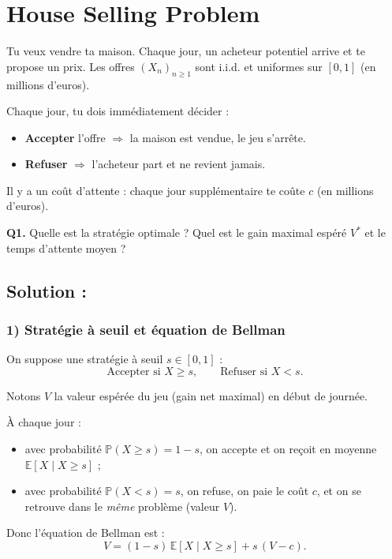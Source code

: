 \section{House Selling Problem}

\begin{exerciseBox}
Tu veux vendre ta maison. Chaque jour, un acheteur potentiel arrive et te propose un prix. Les offres $(X_n)_{n\ge1}$ sont i.i.d. et uniformes sur $[0,1]$ (en millions d'euros).

Chaque jour, tu dois immédiatement décider :
\begin{itemize}
\item \textbf{Accepter} l'offre $\Rightarrow$ la maison est vendue, le jeu s'arrête.
\item \textbf{Refuser} $\Rightarrow$ l'acheteur part et ne revient jamais.
\end{itemize}

Il y a un coût d'attente : chaque jour supplémentaire te coûte $c$ (en millions d'euros).

\textbf{Q1.} Quelle est la stratégie optimale ? Quel est le gain maximal espéré $V^*$ et le temps d'attente moyen ?
\end{exerciseBox}

\subsection*{Solution :}

\subsubsection*{1) Stratégie à seuil et équation de Bellman}

On suppose une stratégie à seuil $s\in[0,1]$ :
\[
\text{Accepter si } X\ge s,\qquad \text{Refuser si } X<s.
\]

Notons $V$ la valeur espérée du jeu (gain net maximal) en début de journée.

À chaque jour :
\begin{itemize}
\item avec probabilité $\mathbb{P}(X\ge s)=1-s$, on accepte et on reçoit en moyenne
$\mathbb{E}[X\mid X\ge s]$ ;
\item avec probabilité $\mathbb{P}(X<s)=s$, on refuse, on paie le coût $c$, et on se retrouve
dans le \emph{même} problème (valeur $V$).
\end{itemize}

Donc l'équation de Bellman est :
\[
V=(1-s)\,\mathbb{E}[X\mid X\ge s]+s\,(V-c).
\]

